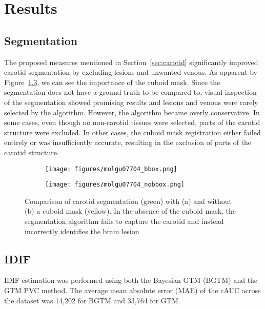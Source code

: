 \chapter{Results}
\section{Segmentation}
The proposed measures mentioned in Section~\ref{sec:carotid} significantly improved carotid segmentation by excluding lesions and unwanted venous.
As apparent by Figure~\ref{fig:seg_compare}, we can see the importance of the cuboid mask.
Since the segmentation does not have a ground truth to be compared to, visual inspection of the segmentation showed promising results and lesions and venous were rarely selected by the algorithm.
However, the algorithm became overly conservative.
In some cases, even though no non-carotid tissues were selected, parts of the carotid structure were excluded.
In other cases, the cuboid mask registration either failed entirely or was insufficiently accurate, resulting in the exclusion of parts of the carotid structure.

\begin{figure}[h]
	\centering
	\begin{subfigure}{0.45\textwidth}
		\texttt{[image: figures/molgu07704\_bbox.png]}
		\caption{}
		\label{subfig:seg_bbox}
	\end{subfigure}
	\begin{subfigure}{0.45\textwidth}
		\texttt{[image: figures/molgu07704\_nobbox.png]}
		\caption{}
		\label{subfig:seg_nobbox}
	\end{subfigure}
	\caption{Comparison of carotid segmentation (green) with (a) and without (b) a cuboid mask (yellow). In the absence of the cuboid mask, the segmentation algorithm fails to capture the carotid and instead incorrectly identifies the brain lesion}
	\label{fig:seg_compare}
\end{figure}

\section{IDIF}
IDIF estimation was performed using both the Bayesian GTM (BGTM) and the GTM PVC method. The average mean absolute error (MAE) of the cAUC across the dataset was 14,202 for BGTM and 33,764 for GTM.

